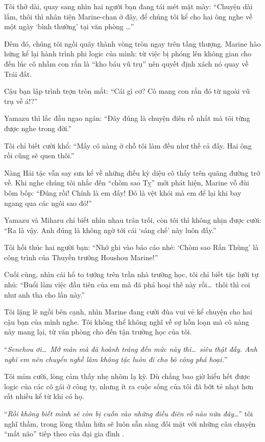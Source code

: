 \documentclass[../main.tex]{subfiles}
\begin{document}
Tôi thở dài, quay sang nhìn hai người bạn đang tái mét mặt mày: ``Chuyện dài lắm, thôi thì nhân tiện Marine-chan ở đây, để chúng tôi kể cho hai ông nghe về một ngày `bình thường' tại văn phòng \hll\dots''

Đêm đó, chúng tôi ngồi quây thành vòng tròn ngay trên tầng thượng. Marine hào hứng kể lại hành trình phi logic của mình: từ việc bị phóng lên không gian cho đến lúc cô nhầm con rắn là ``kho báu vũ trụ'' nên quyết định xách nó quay về Trái đất.

Cậu bạn lập trình trợn tròn mắt: ``Cái gì cơ? Cô mang con rắn đó từ ngoài vũ trụ về á!?''

Yamazu thì lắc đầu ngao ngán: ``Đây đúng là chuyện điên rồ nhất mà tôi từng được nghe trong đời.''

Tôi chỉ biết cười khổ: ``Mấy cô nàng ở chỗ tôi làm đều như thế cả đấy. Hai ông rồi cũng sẽ quen thôi.''

Nàng Hải tặc vẫn say sưa kể về những điều kỳ diệu cô thấy trên quãng đường trở về. Khi nghe chúng tôi nhắc đến ``chòm sao Tỵ'' mới phát hiện, Marine vỗ đùi bôm bốp: ``Đúng rồi! Chính là em đấy! Đó là vệt khói mà em để lại khi bay ngang qua các ngôi sao đó!''

Yamazu và Miharu chỉ biết nhìn nhau trân trối, còn tôi thì không nhịn được cười: ``Ra là vậy. Anh đúng là không ngờ tới cái `sáng chế' này luôn đấy.''

Tôi hối thúc hai người bạn: ``Nhớ ghi vào báo cáo nhé: `Chòm sao Rắn Thùng' là công trình của Thuyền trưởng Houshou Marine!''

Cuối cùng, nhìn cái hố to tướng trên trần nhà trường học, tôi chỉ biết tặc lưỡi tự nhủ: ``Buổi làm việc đầu tiên của em mà đã phá hoại thế này rồi\dots\ thôi thì coi như anh tha cho lần này.''

Tôi lặng lẽ ngồi bên cạnh, nhìn Marine đang cười đùa vui vẻ kể chuyện cho hai cậu bạn của mình nghe. Tôi không thể không nghĩ về sự hỗn loạn mà cô nàng này mang lại, từ văn phòng cho đến tận trường học của tôi.

``\textit{Senchou ơi\dots\ Mở màn mà đã hoành tráng đến mức này thì\dots\ siêu thật đấy. Anh nghĩ em nên chuyển nghề làm không tặc luôn đi cho bõ công phá hoại.}''

Tôi mỉm cười, lòng cảm thấy nhẹ nhõm lạ kỳ. Dù chẳng bao giờ hiểu hết được logic của các cô gái ở công ty, nhưng ít ra cuộc sống của tôi đã bớt tẻ nhạt hơn rất nhiều kể từ khi có họ.

``\textit{Rồi không biết mình sẽ còn bị cuốn vào những điều điên rồ nào nữa đây\dots}'' tôi nghĩ thầm, trong lòng thầm hứa sẽ luôn sẵn sàng đối mặt với những câu chuyện ``mất não'' tiếp theo của đại gia đình \hll.
\end{document}
